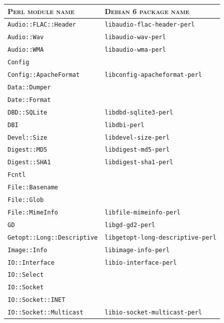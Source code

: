 \documentclass[a4paper,oneside,10pt]{report}
\begin{document}
\begin{table}
	\centering
	\begin{tabular}{|p{15em}|p{17em}|}
		\hline
		\textsc{Perl module name} 				& \textsc{Debian 6 package name} \\
		\hline
		\hline
		\verb|Audio::FLAC::Header| 				& \verb|libaudio-flac-header-perl| \\
		\hline
		\verb|Audio::Wav| 								& \verb|libaudio-wav-perl| \\
		\hline
		\verb|Audio::WMA| 								& \verb|libaudio-wma-perl| \\
		\hline
		\verb|Config| 										& \\
		\hline
		\verb|Config::ApacheFormat|				& \verb|libconfig-apacheformat-perl| \\
		\hline
		\verb|Data::Dumper| 							& \\
		\hline
		\verb|Date::Format| 							& \\
		\hline
		\verb|DBD::SQLite|								& \verb|libdbd-sqlite3-perl| \\
		\hline
		\verb|DBI|												& \verb|libdbi-perl| \\
		\hline
		\verb|Devel::Size| 								& \verb|libdevel-size-perl| \\
		\hline
		\verb|Digest::MD5| 								& \verb|libdigest-md5-perl| \\
		\hline
		\verb|Digest::SHA1| 							& \verb|libdigest-sha1-perl| \\
		\hline
		\verb|Fcntl| 											& \\
		\hline
		\verb|File::Basename| 						& \\
		\hline
		\verb|File::Glob| 								& \\
		\hline
		\verb|File::MimeInfo| 						& \verb|libfile-mimeinfo-perl| \\
		\hline
		\verb|GD| 												& \verb|libgd-gd2-perl| \\
		\hline
		\verb|Getopt::Long::Descriptive| 	& \verb|libgetopt-long-descriptive-perl| \\
		\hline
		\verb|Image::Info| 								& \verb|libimage-info-perl| \\
		\hline
		\verb|IO::Interface| 							& \verb|libio-interface-perl| \\
		\hline
		\verb|IO::Select| 								& \\
		\hline
		\verb|IO::Socket| 								& \\
		\hline
		\verb|IO::Socket::INET| 					& \\
		\hline
		\verb|IO::Socket::Multicast| 			& \verb|libio-socket-multicast-perl| \\

\end{tabular}
\end{table}
\end{document}
